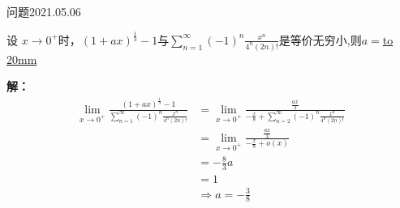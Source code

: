 \begin{mybox}{问题2021.05.06}
	
	\qquad 设 $x \to 0^{+}$时，$(1+ax)^{\frac{1}{3}}-1$与$\sum \limits_{n=1}^{\infty} (-1)^n \frac{x^n}{4^n(2n)!}$是等价无穷小,则$a=$\underline{\hbox to 20mm{}}
\end{mybox}
\noindent
\textbf{解：}
\begin{align*}
	\lim\limits_{x \to 0^{+}} \frac{(1+ax)^{\frac{1}{3}}-1}{\sum \limits_{n=1}^{\infty} (-1)^n \frac{x^n}{4^n(2n)!}}&=\lim\limits_{x \to 0^{+}} \frac{\frac{ax}{3}}{-\frac{x}{8}+\sum \limits_{n=2}^{\infty} (-1)^n \frac{x^n}{4^n(2n)!}}\\
	&=\lim\limits_{x \to 0^{+}} \frac{\frac{ax}{3}}{-\frac{x}{8}+o(x)}\\
	&=-\frac{8}{3}a\\
	&=1\\
	&\Rightarrow a=-\frac{3}{8}
\end{align*}